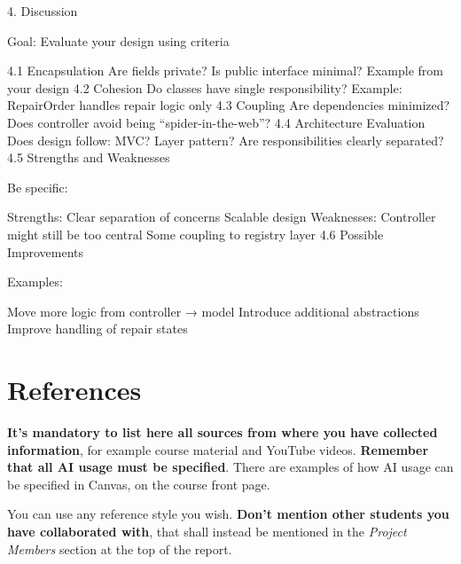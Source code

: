 \documentclass[a4paper]{scrartcl}
\begin{document}
4. Discussion

Goal: Evaluate your design using criteria

4.1 Encapsulation
Are fields private?
Is public interface minimal?
Example from your design
4.2 Cohesion
Do classes have single responsibility?
Example:
RepairOrder handles repair logic only
4.3 Coupling
Are dependencies minimized?
Does controller avoid being “spider-in-the-web”?
4.4 Architecture Evaluation
Does design follow:
MVC?
Layer pattern?
Are responsibilities clearly separated?
4.5 Strengths and Weaknesses

Be specific:

Strengths:
Clear separation of concerns
Scalable design
Weaknesses:
Controller might still be too central
Some coupling to registry layer
4.6 Possible Improvements

Examples:

Move more logic from controller → model
Introduce additional abstractions
Improve handling of repair states

\section*{References}

\textbf{It's mandatory to list here all sources from where you have collected information}, for example course material and YouTube videos. \textbf{Remember that all AI usage must be specified}. There are examples of how AI usage can be specified in Canvas, on the course front page.

You can use any reference style you wish. \textbf{Don't mention other students you have collaborated with}, that shall instead be mentioned in the \textit{Project Members} section at the top of the report.
\end{document}
